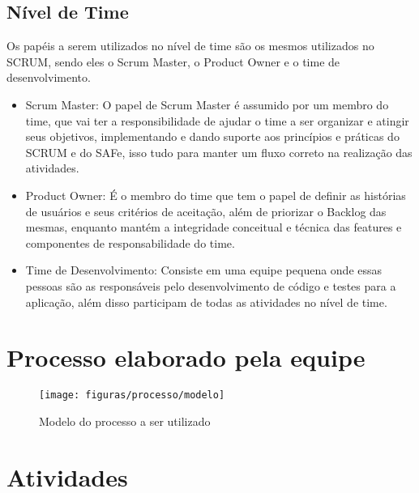 \subsection{Nível de Time}
Os papéis a serem utilizados no nível de time são os mesmos utilizados no SCRUM, sendo eles o Scrum Master, o Product Owner e o time de desenvolvimento.

\begin{itemize}
\item Scrum Master: O papel de Scrum Master é assumido por um membro do time, que vai ter a responsibilidade de ajudar o time a ser organizar e atingir seus objetivos, implementando e dando suporte aos princípios e práticas do SCRUM e do SAFe, isso tudo para manter um fluxo correto na realização das atividades.
\item Product Owner: É o membro do time que tem o papel de definir as histórias de usuários e seus critérios de aceitação, além de priorizar o Backlog das mesmas, enquanto mantém a integridade conceitual e técnica das features e componentes de responsabilidade do time.
\item Time de Desenvolvimento: Consiste em uma equipe pequena onde essas pessoas são as responsáveis pelo desenvolvimento de código e testes para a aplicação, além disso participam de todas as atividades no nível de time.
\end{itemize}

\newpage
\section{Processo elaborado pela equipe}
\begin{figure}[!htpb]
\centering	
\texttt{[image: figuras/processo/modelo]}
\caption{Modelo do processo a ser utilizado}
\end{figure}

\newpage

\section{Atividades}

